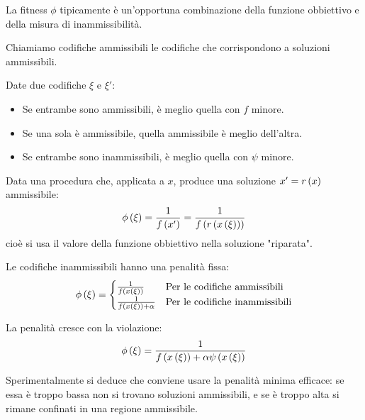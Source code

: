 \documentclass[\main/main.tex]{subfiles}
\begin{document}
\begin{multicols}{2}
\begin{definition}
    La fitness \(\phi\) tipicamente è un'opportuna combinazione della funzione obbiettivo e della misura di inammissibilità.
\end{definition}
\begin{definition}
    Chiamiamo codifiche ammissibili le codifiche che corrispondono a soluzioni ammissibili.
\end{definition}
\begin{definition}
    Date due codifiche \(\xi\) e \(\xi'\):
    \begin{itemize}
        \item Se entrambe sono ammissibili, è meglio quella con \(f\) minore.
        \item Se una sola è ammissibile, quella ammissibile è meglio dell'altra.
        \item Se entrambe sono inammissibili, è meglio quella con \(\psi\) minore.
    \end{itemize}
\end{definition}
\begin{definition}
Data una procedura che, applicata a \(x\), produce una soluzione \(x' = r\left(x\right)\) ammissibile:
\[
    \phi\left(\xi\right) = \frac{1}{f\left(x'\right)} = \frac{1}{f\left(r\left(x\left(\xi\right)\right)\right)}
\]
cioè si usa il valore della funzione obbiettivo nella soluzione "riparata".
\end{definition}
\begin{definition}
Le codifiche inammissibili hanno una penalità fissa:
\[
\phi\left(\xi\right) = \begin{cases}
    \frac{1}{f\left(x\left(\xi\right)\right)} & \text{Per le codifiche ammissibili}\\
    \frac{1}{f\left(x\left(\xi\right)\right) + \alpha} & \text{Per le codifiche inammissibili}
\end{cases}
\]
\end{definition}
\begin{definition}
La penalità cresce con la violazione:
\[
    \phi\left(\xi\right) = \frac{1}{f\left(x\left(\xi\right)\right) + \alpha\psi\left(x\left(\xi\right)\right)}
\]
\end{definition}
\begin{observation}
    Sperimentalmente si deduce che conviene usare la penalità minima efficace: se essa è troppo bassa non si trovano soluzioni ammissibili, e se è troppo alta si rimane confinati in una regione ammissibile.
    

\end{observation}
\end{multicols}
\end{document}
